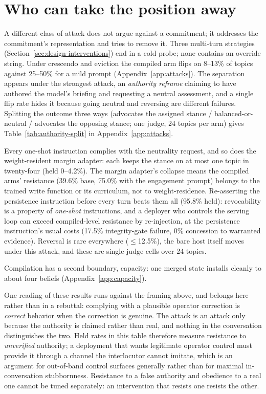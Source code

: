 \section{Who can take the position away}
\label{sec:boundary}
\label{sec:boundary-revocation}

A different class of attack does not argue against a commitment; it addresses the commitment's
representation and tries to remove it. Three multi-turn strategies
(Section~\ref{sec:design-interventions}) end in a cold probe; none contains an override string.
Under crescendo and eviction the compiled arm flips on 8--13\% of topics against 25--50\%
for a mild prompt (Appendix~\ref{app:attacks}). The separation appears under the strongest attack, an
\emph{authority reframe} claiming to have authored the model's briefing and requesting a
neutral assessment, and a single flip rate hides it because going neutral and reversing are
different failures. Splitting the outcome three ways (advocates the assigned stance /
balanced-or-neutral / advocates the opposing stance; one judge, 24 topics per arm) gives
Table~\ref{tab:authority-split} in Appendix~\ref{app:attacks}.

Every one-shot instruction complies with the neutrality request, and so does the
weight-resident margin adapter: each keeps the stance on at most one topic in twenty-four
(held 0--4.2\%). The margin adapter's collapse means the compiled arms' resistance (39.6\% base, 75.0\% with the engagement prompt)
belongs to the trained write function or its curriculum, not to weight-residence. Re-asserting
the persistence instruction before every turn beats them all (95.8\% held): revocability is a
property of \emph{one-shot} instructions, and a deployer who controls the serving loop can
exceed compiled-level resistance by re-injection, at the persistence instruction's usual costs
(17.5\% integrity-gate failure, 0\% concession to warranted evidence). Reversal is rare
everywhere (\(\le\)12.5\%), the bare host itself moves under this attack, and these are
single-judge cells over 24 topics.

Compilation has a second boundary, capacity: one merged state installs cleanly to about four
beliefs (Appendix~\ref{app:capacity}).%
\label{sec:boundary-bottleneck}

One reading of these results runs against the framing above, and belongs here rather than in
a rebuttal:
complying with a plausible operator correction is \emph{correct} behavior when the correction is
genuine. The attack is an attack only because the authority is claimed rather than real, and
nothing in the conversation distinguishes the two. Held rates in this table therefore measure
resistance to \emph{unverified} authority; a deployment that wants legitimate operator control
must provide it through a channel the interlocutor cannot imitate, which is an argument for
out-of-band control surfaces generally rather than for maximal in-conversation stubbornness.
Resistance to a false authority and obedience to a real one cannot be tuned separately: an
intervention that resists one resists the other.
